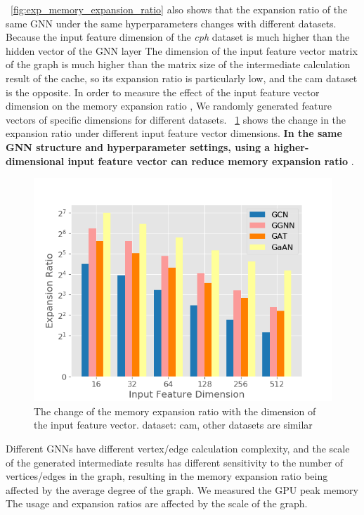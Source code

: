 \figurename~\ref{fig:exp_memory_expansion_ratio} also shows that the expansion ratio of the same GNN under the same hyperparameters changes with different datasets.
Because the input feature dimension of the \textit{cph} dataset is much higher than the hidden vector of the GNN layer The dimension of the input feature vector matrix
of the graph is much higher than the matrix size of the intermediate calculation result of the cache,
so its expansion ratio is particularly low, and the cam dataset is the opposite. In order to measure the effect of the input feature vector dimension on the memory
expansion ratio , We randomly generated feature vectors of specific dimensions for different datasets.
\figurename~\ref{fig:exp_memory_expension_ratio_input_feature_dimension} shows the change in the expansion ratio under different input feature vector dimensions.
\textbf{In the same GNN structure and hyperparameter settings, using a higher-dimensional input feature vector can reduce memory expansion ratio} .

\begin{figure}
    \centering
    \includegraphics[width=0.7\columnwidth]{figs/experiments/exp_memory_expansion_ratio_input_feature_dimension_com-amazon.png}
    \caption{The change of the memory expansion ratio with the dimension of the input feature vector. dataset: cam, other datasets are similar}
    \label{fig:exp_memory_expension_ratio_input_feature_dimension}
\end{figure}

Different GNNs have different vertex/edge calculation complexity, and the scale of the generated intermediate results has different sensitivity
to the number of vertices/edges in the graph, resulting in the memory expansion ratio being affected by the average degree of the graph.
We measured the GPU peak memory The usage and expansion ratios are affected by the scale of the graph.

